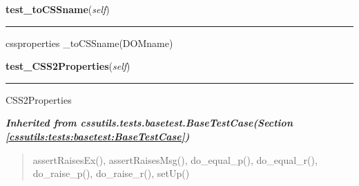     \label{cssutils:tests:test_cssproperties:CSSPropertiesTestCase:test_toCSSname}

    \vspace{0.5ex}

\hspace{.8\funcindent}\begin{boxedminipage}{\funcwidth}

    \raggedright \textbf{test\_toCSSname}(\textit{self})

    \vspace{-1.5ex}

    \rule{\textwidth}{0.5\fboxrule}
\setlength{\parskip}{2ex}
    cssproperties \_toCSSname(DOMname)

\setlength{\parskip}{1ex}
    \end{boxedminipage}

    \label{cssutils:tests:test_cssproperties:CSSPropertiesTestCase:test_CSS2Properties}

    \vspace{0.5ex}

\hspace{.8\funcindent}\begin{boxedminipage}{\funcwidth}

    \raggedright \textbf{test\_CSS2Properties}(\textit{self})

    \vspace{-1.5ex}

    \rule{\textwidth}{0.5\fboxrule}
\setlength{\parskip}{2ex}
    CSS2Properties

\setlength{\parskip}{1ex}
    \end{boxedminipage}


\large{\textbf{\textit{Inherited from cssutils.tests.basetest.BaseTestCase\textit{(Section \ref{cssutils:tests:basetest:BaseTestCase})}}}}

\begin{quote}
assertRaisesEx(), assertRaisesMsg(), do\_equal\_p(), do\_equal\_r(), do\_raise\_p(), do\_raise\_r(), setUp()
\end{quote}

